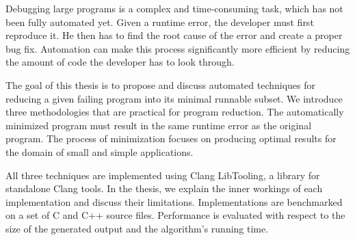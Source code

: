 \documentclass[12pt]{report}
\begin{document}

Debugging large programs is a complex and time-consuming task, which has not 
been fully automated yet. 
Given a runtime error, the developer must first reproduce it. 
He then has to find the root cause of the error and create a proper bug fix. 
Automation can make this process significantly more efficient by reducing 
the amount of code the developer has to look through. 

The goal of this thesis is to propose and discuss automated techniques for 
reducing a given failing program into its minimal runnable subset. 
We introduce three methodologies that are practical for program reduction. 
The automatically minimized program must result in the same runtime error as 
the original program. 
The process of minimization focuses on producing optimal results for 
the domain of small and simple applications. 

All three techniques are implemented using Clang LibTooling, a library for 
standalone Clang tools. 
In the thesis, we explain the inner workings of each implementation and 
discuss their limitations. 
Implementations are benchmarked on a set of C and C++ source files. 
Performance is evaluated with respect to the size of the generated output and 
the algorithm's running time. 
\end{document}
